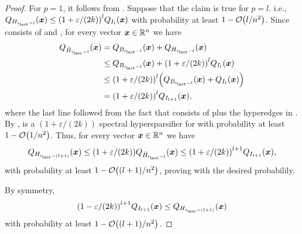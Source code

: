 \begin{proof}
For \( p = 1 \), it follows from .
Suppose that the claim is true for \( p = l \).
i.e., \( Q_{\hypergraph{H_{\ilast - l }}}( \vect{x} ) \leq \left( 1 + \varepsilon / (2k) \right)^{l} Q_{\hypergraph{I_{l}}}( \vect{x} ) \)
 with probability at least \( 1- \atmost{l/n^2} \).
Since  consists of  and , for every vector \( \boldsymbol{x} \in \mathbb R ^n \) we have
\begin{align*}
Q_{ \hypergraph{\sparsifier{H_{\ilast-l}}} } (\vect{x}) 
&= Q_{\hypergraph{B_{\ilast- l }}}( \vect{x} ) 
+ Q_{\hypergraph{H_{\ilast- l }}}( \vect{x} )
\\
&\leq 
 Q_{\hypergraph{B_{\ilast- l }}}( \vect{x} ) 
+ 
\left( 1 + \varepsilon / (2k) \right)^{l}
Q_{\hypergraph{I_l}}( \vect{x} )
\\
&\leq
\left( 1 + \varepsilon / (2k) \right)^{l} 
\left( 
 Q_{\hypergraph{B_{\ilast-l} }}( \vect{x} )
 +
 Q_{\hypergraph{I_l }}( \vect{x} ) 
\right)
\\
&= \left( 1 + \varepsilon / (2k) \right)^{l} Q_{\hypergraph{I_{l + 1 }}}( \vect{x} ) ,
\end{align*}
where the last line followed from the fact that  consists of  plus the hyperedges in .
By ,  is a \( \left( 1 + \varepsilon / (2k) \right) \) spectral hypersparsifier for  with probability at least \( 1 - \atmost{1/n^2} \).
Thus, for every vector \( \boldsymbol{x} \in \mathbb R ^n \) we have
\begin{equation} \label{eq:spectral_proof_1}
Q_{\hypergraph{H_{\ilast - (l+ 1) }}}( \vect{x} ) 
\leq
\left( 1 + \varepsilon / (2k) \right) Q_{ \hypergraph{\sparsifier{H_{\ilast-l}}} }( \vect{x} ) 
\leq 
\left( 1 + \varepsilon / (2k) \right)^{l+ 1} Q_{\hypergraph{I_{l + 1}}}( \vect{x} ),
\end{equation}
with probability at least \( 1 - \atmost{(l + 1)/n^2} \), proving  with the desired probabilily.


By symmetry, 
\begin{equation} \label{eq:spectral_proof_2}
\left( 1 - \varepsilon / (2k) \right)^{l+ 1} Q_{\hypergraph{I_{l + 1 }}} ( \vect{x} ) \leq Q_{\hypergraph{H_{\ilast - (l+ 1) }}} ( \vect{x} )
\end{equation}
with probability at least \( 1 - \atmost{(l + 1)/n^2} \).


\end{proof}
